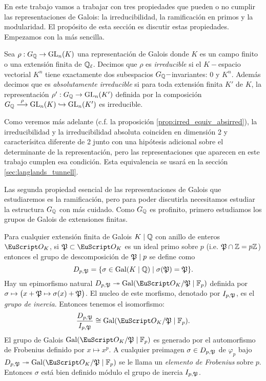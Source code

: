\documentclass[../../tesis_maestria]{subfiles}
\begin{document}
En este trabajo vamos a trabajar con tres propiedades que pueden o no cumplir las representaciones de Galois: la irreducibilidad, la ramificaci\'on en primos y la modularidad. El prop\'osito de esta secci\'on es discutir estas propiedades. Empezamos con la m\'as sencilla.

\begin{defin}
  Sea $\rho:G_{\mathbb{Q}}\rightarrow\mathrm{GL}_n(K)$ una representaci\'on de Galois donde $K$ es un campo finito o una extensi\'on finita de $\mathbb{Q}_\ell$. Decimos que $\rho$ es \emph{irreducible} si el $K-$espacio vectorial $K^n$ tiene exactamente dos subespacios $G_{\mathbb{Q}}-$invariantes: 0 y $K^n$. Adem\'as decimos que es \emph{absolutamente irreducible} si para toda extensi\'on finita $K'$ de $K$, la representaci\'on $\rho':G_{\mathbb{Q}}\rightarrow\mathrm{GL}_n(K')$ definida por la composici\'on $G_{\mathbb{Q}}\overset{\rho}{\longrightarrow}\mathrm{GL}_n(K)\hookrightarrow\mathrm{GL}_n(K')$ es irreducible.
\end{defin}

Como veremos m\'as adelante (c.f. la proposici\'on \ref{prop:irred_equiv_absirred}), la irreducibilidad y la irreducibilidad absoluta coinciden en dimensi\'on 2 y caracter\'isitca diferente de 2 junto con una hip\'otesis adicional sobre el determinante de la representaci\'on, pero las representaciones que aparecen en este trabajo cumplen esa condici\'on. Esta equivalencia se usar\'a en la secci\'on \ref{sec:langlands_tunnell}.

Las segunda propiedad esencial de las representaciones de Galois que estudiaremos es la ramificaci\'on, pero para poder discutirla necesitamos estudiar la estructura $G_{\mathbb{Q}}$ con m\'as cuidado. Como $G_{\mathbb{Q}}$ es profinito, primero estudiamos los grupos de Galois de extensiones finitas.

Para cualquier extensi\'on finita de Galois $K\mid\mathbb{Q}$ con anillo de enteros $\Oo_K$, si $\fP\subset\Oo_K$ es un ideal primo sobre $p$ (i.e. $\mathfrak{P}\cap\mathbb{Z}=p\mathbb{Z}$) entonces el grupo de descomposici\'on de $\mathfrak{P}\mid p$ se define como
\[
  D_{p,\mathfrak{P}}=\{\sigma\in\mathrm{Gal}(K\mid\mathbb{Q})\mid \sigma(\mathfrak{P})=\mathfrak{P}\}.
\]
Hay un epimorfismo natural $D_{p,\fP}\epi\Gal(\Oo_{K}/\fP\mid \FF_p)$ definida por $\sigma\mapsto\big(x+\mathfrak{P}\mapsto \sigma(x)+\mathfrak{P}\big)$. El nucleo de este morfismo, denotado por $I_{p,\mathfrak{P}}$, es el \emph{grupo de inercia}. Entonces tenemos el isomorfismo:
\begin{equation}\label{eq:iso_decomp_inercia}
  \frac{D_{p,\fP}}{I_{p,\fP}}\cong\Gal(\Oo_K/\fP \mid\FF_p).
\end{equation}
El grupo de Galois $\Gal(\Oo_K/\fP \mid\FF_p)$ es generado por el automorfismo de Frobenius definido por $x\mapsto x^p$.  A cualquier preimagen $\sigma\in D_{p,\mathfrak{P}}$ de $\varphi_p$ bajo $D_{p,\fP}\epi\Gal(\Oo_{K}/\fP\mid \FF_p)$  se le llama un \emph{elemento de Frobenius} sobre $p$. Entonces $\sigma$ est\'a bien definido m\'odulo el grupo de inercia $I_{p,\mathfrak{P}}$.
\end{document}
